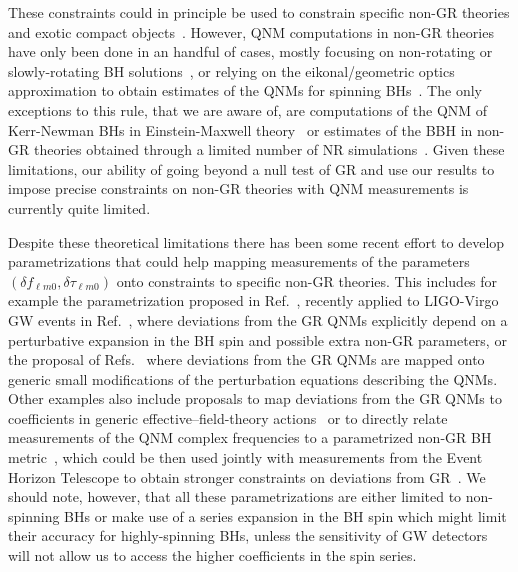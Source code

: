\documentclass[twocolumn,prd,aps,superscriptaddress,preprintnumbers,tightenlines,showpacs,nofootinbib,eqsecnum,amsfonts,amsmath]{revtex4-1}
\begin{document}
These constraints could in principle be used to constrain specific
non-GR theories and exotic compact objects~\cite{Glampedakis:2017cgd,Cardoso:2019rvt,Maggio:2020jml}. 
However, QNM computations in non-GR theories have only been done in an
handful of cases, mostly focusing on non-rotating or slowly-rotating
BH solutions~\cite{Ferrari:2000ep,Molina:2010fb,Pani:2009wy,Blazquez-Salcedo:2016enn,Blazquez-Salcedo:2017txk,Brito:2018hjh,Franciolini:2018uyq,Cardoso:2018ptl,Tattersall:2018nve,Tattersall:2019nmh,Blazquez-Salcedo:2019nwd,Silva:2019scu,Glampedakis:2019dqh,Blazquez-Salcedo:2020jee,Blazquez-Salcedo:2020caw,Cano:2020cao,Wagle:2021tam,Pierini:2021jxd}, 
or relying on the eikonal/geometric optics approximation to obtain
estimates of the QNMs for spinning BHs~\cite{Blazquez-Salcedo:2016enn,Glampedakis:2017dvb,Jai-akson:2017ldo}. The
only exceptions to this rule, that we are aware of, are computations
of the QNM of Kerr-Newman BHs in Einstein-Maxwell
theory~\cite{Pani:2013ija,Pani:2013wsa,Mark:2014aja,Dias:2015wqa} or estimates of the BBH in non-GR theories obtained
through a limited number of NR simulations~\cite{Okounkova:2019dfo,Okounkova:2019zjf}. Given these
limitations, our ability of going beyond a null test of GR and use our
results to impose precise constraints on non-GR theories with QNM
measurements is currently quite limited.

Despite these theoretical limitations there has been some recent effort to develop
parametrizations that could help mapping measurements of the
parameters $(\delta f_{\ell m 0}, \delta \tau_{\ell m0})$ onto
constraints to specific non-GR theories. This includes for example
the parametrization proposed in Ref.~\cite{Maselli:2019mjd}, recently
applied to LIGO-Virgo GW events in Ref.~\cite{Carullo:2021dui}, where
deviations from the GR QNMs explicitly depend on a perturbative
expansion in the BH spin and possible extra non-GR parameters, or the
proposal of Refs.~\cite{Cardoso:2019mqo,McManus:2019ulj} where
deviations from the GR QNMs are mapped onto generic small
modifications of the perturbation equations describing the QNMs. Other
examples also include proposals to map deviations from the GR QNMs to
coefficients in generic effective--field-theory
actions~\cite{Cardoso:2018ptl,Franciolini:2018uyq,Cano:2020cao} or to
directly relate measurements of the QNM complex frequencies to a
parametrized non-GR BH metric~\cite{Glampedakis:2017dvb,Suvorov:2021amy,Volkel:2020daa}, 
which could be then used jointly with measurements from the Event
Horizon Telescope to obtain stronger constraints on deviations from
GR~\cite{Volkel:2020daa,Volkel:2020xlc,Psaltis:2020lvx,Yang:2021zqy}.
We should note, however, that all these parametrizations are either
limited to non-spinning BHs or make use of a series expansion in the
BH spin which might limit their accuracy for highly-spinning BHs, unless 
the sensitivity of GW detectors will not allow us to access the higher 
coefficients in the spin series.
\end{document}
